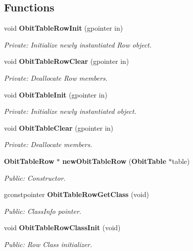\subsection*{Functions}
\begin{CompactItemize}
\item 
void {\bf Obit\-Table\-Row\-Init} (gpointer in)
\begin{CompactList}\small\item\em Private: Initialize newly instantiated Row object. \item\end{CompactList}\item 
void {\bf Obit\-Table\-Row\-Clear} (gpointer in)
\begin{CompactList}\small\item\em Private: Deallocate Row members. \item\end{CompactList}\item 
void {\bf Obit\-Table\-Init} (gpointer in)
\begin{CompactList}\small\item\em Private: Initialize newly instantiated object. \item\end{CompactList}\item 
void {\bf Obit\-Table\-Clear} (gpointer in)
\begin{CompactList}\small\item\em Private: Deallocate members. \item\end{CompactList}\item 
{\bf Obit\-Table\-Row} $\ast$ {\bf new\-Obit\-Table\-Row} ({\bf Obit\-Table} $\ast$table)
\begin{CompactList}\small\item\em Public: Constructor. \item\end{CompactList}\item 
gconstpointer {\bf Obit\-Table\-Row\-Get\-Class} (void)
\begin{CompactList}\small\item\em Public: Class\-Info pointer. \item\end{CompactList}\item 
void {\bf Obit\-Table\-Row\-Class\-Init} (void)
\begin{CompactList}\small\item\em Public: Row Class initializer. \item\end{CompactList}\item 

\end{CompactItemize}
